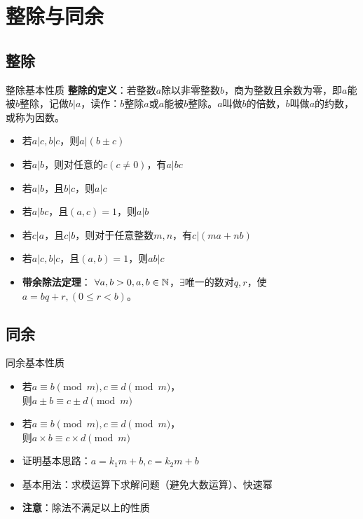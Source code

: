 \section{整除与同余}
\subsection{整除}
\begin{frame}{整除基本性质}
\textbf{整除的定义}：若整数$a$除以非零整数$b$，商为整数且余数为零，即$a$能被$b$整除，记做$b|a$，读作：$b$整除$a$或$a$能被$b$整除。$a$叫做$b$的倍数，$b$叫做$a$的约数，或称为因数。
\pause
\begin{itemize}
  \item 若$a|c,b|c$，则$a|(b\pm c)$
  \item 若$a|b$，则对任意的$c(c\neq 0)$，有$a|bc$
  \item 若$a|b$，且$b|c$，则$a|c$
  \item 若$a|bc$，且$(a,c)=1$，则$a|b$
  \item 若$c|a$，且$c|b$，则对于任意整数$m,n$，有$c|(ma+nb)$
  \item 若$a|c,b|c$，且$(a,b)=1$，则$ab|c$
  \item \textbf{带余除法定理}： $\forall a,b>0, a,b\in \mathbb{N}$，$\exists$唯一的数对$q,r$，使$a=bq+r,(0\leq r<b)$。
\end{itemize}
\end{frame}


\subsection{同余}
\begin{frame}{同余基本性质}
\begin{itemize}
  \item 若$a\equiv b\pmod{m},c\equiv d\pmod{m}$，\\则$a\pm b\equiv c\pm d\pmod{m}$
  \item 若$a\equiv b\pmod{m},c\equiv d\pmod{m}$，\\则$a\times b\equiv c\times d\pmod{m}$ \pause
  \item 证明基本思路：$a=k_1m+b,c=k_2m+b$ \pause
  \item 基本用法：求模运算下求解问题（避免大数运算）、快速幂 \pause
  \item \textbf{注意}：除法不满足以上的性质
\end{itemize}
\end{frame}

